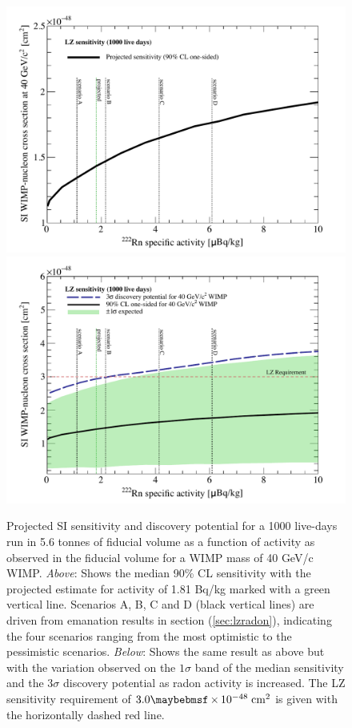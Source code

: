 {%
\begin{figure}[H!]
    \centering
    \vspace{-1cm}
    \includegraphics[scale=0.68]{Chapter_5/Figures/sensitivity_studies/radon_sensitivity.pdf}
    \includegraphics[scale=0.68]{Chapter_5/Figures/sensitivity_studies/radon_sensitivity_discovery.pdf}
    \caption[Projected SI sensitivity and discovery potential for a 1000 live-days run in 5.6 tonnes of fiducial volume as a function of \RnTTT{} activity as observed in the fiducial volume for a WIMP mass of 40 GeV/c\squared{} WIMP.]%
    {Projected SI sensitivity and discovery potential for a 1000 live-days run in 5.6 tonnes of fiducial volume as a function of \RnTTT{} activity as observed in the fiducial volume for a WIMP mass of 40 GeV/c\squared{} WIMP. \textit{Above}: Shows the median 90\% CL sensitivity with the projected estimate for \RnTTT{} activity of 1.81 \micro{}Bq/kg marked with a green vertical line. Scenarios A, B, C and D (black vertical lines) are driven from emanation results in section (\ref{sec:lzradon}), indicating the four scenarios ranging from the most optimistic to the pessimistic scenarios. \textit{Below}: Shows the same result as above but with the variation observed on the $1\sigma$ band of the median sensitivity and the $3\sigma$ discovery potential as radon activity is increased. The LZ sensitivity requirement of $3.0 \times 10^{-48} \; \MathText{cm}^2$ is given with the horizontally dashed red line.}

\end{figure}}
